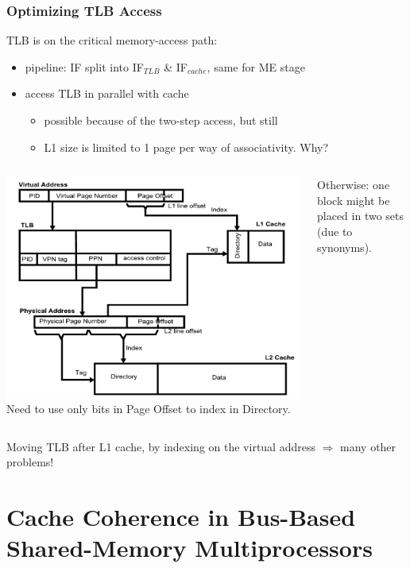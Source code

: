 \documentclass{beamer}
\renewcommand{\emph}[1]{\textcolor{structure}{#1}}
\newcommand{\emp}[1]{\textcolor{DikuRed}{ #1}}
\begin{document}
\begin{frame}[fragile,t]
\frametitle{Optimizing TLB Access}

TLB is on the critical memory-access path:
\begin{itemize}
    \item pipeline: IF split into IF$_{TLB}$ \& IF$_{cache}$, same for ME stage
    \item access TLB in parallel with cache
        \begin{itemize}
            \item \emph{possible because of the two-step access}, but still
            \item \emp{L1 size is limited to 1 page per way of associativity. Why?}
        \end {itemize}
\end  {itemize}


\begin{columns}
\includegraphics[width=40ex]{Figures/FigsMemH/TLBtransl}
Need to use only bits in Page Offset to index in Directory.\\\bigskip

Otherwise: one block might be placed in two sets (due to synonyms).
\end{columns}

{\scriptsize Moving TLB after L1 cache, by indexing on the 
 virtual address $\Rightarrow$ many other problems!}

\end{frame}

\section{Cache Coherence in Bus-Based Shared-Memory Multiprocessors}
\begin{frame}[fragile]
	\tableofcontents[currentsection]
\end{frame}
\end{document}
